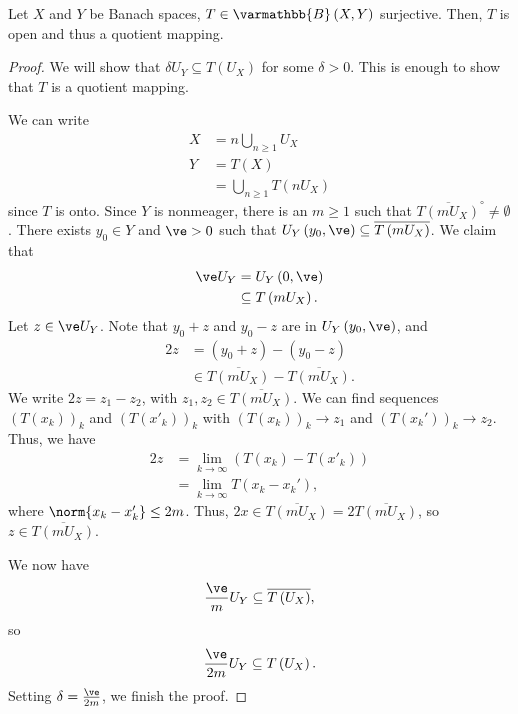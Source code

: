 \documentclass[10pt]{mypackage}
\renewcommand*{\mathbb}[1]{\varmathbb{#1}}
\newcommand{\B}{\mathbb{B}}
\begin{document}
  \begin{theorem}
    Let $X$ and $Y$ be Banach spaces, $T\in \B\left(X,Y\right)$ surjective. Then, $T$ is open and thus a quotient mapping.
  \end{theorem}
  \begin{proof}
    We will show that $\delta U_Y\subseteq T\left(U_X\right)$ for some $\delta > 0$. This is enough to show that $T$ is a quotient mapping.\newline

    We can write
    \begin{align*}
      X &= n\bigcup_{n\geq 1}U_X\\
      Y &= T\left(X\right)\\
        &= \bigcup_{n\geq 1}T\left(nU_X\right)
    \end{align*}
    since $T$ is onto. Since $Y$ is nonmeager, there is an $m \geq 1$ such that $\overline{T\left(mU_X\right)}^{\circ} \neq \emptyset$. There exists $y_0\in Y$ and $\ve > 0$ such that $U_Y\left(y_0,\ve\right) \subseteq \overline{T\left(mU_X\right)}$. We claim that
    \begin{align*}
      \ve U_Y &= U_Y\left(0,\ve\right)\\
              &\subseteq T\left(mU_X\right).
    \end{align*}
    Let $z\in \ve U_Y$. Note that $y_0 + z$ and $y_0 - z$ are in $U_Y\left(y_0,\ve\right)$, and
    \begin{align*}
      2z &= \left(y_0 + z\right) - \left(y_0 - z\right)\\
         &\in \overline{T\left(mU_X\right)} - \overline{T\left(mU_X\right)}.
    \end{align*}
    We write $2z = z_1 - z_2$, with $z_1,z_2\in \overline{T\left(mU_X\right)}$. We can find sequences $\left(T\left(x_k\right)\right)_k$ and $\left(T\left(x'_k\right)\right)_k$ with $\left(T\left(x_k\right)\right)_k\rightarrow z_1$ and $\left(T\left(x_k'\right)\right)_k\rightarrow z_2$. Thus, we have
    \begin{align*}
      2z &= \lim_{k\rightarrow\infty}\left(T\left(x_k\right) - T\left(x'_k\right)\right)\\
         &= \lim_{k\rightarrow\infty}T\left(x_k -x_k'\right),
    \end{align*}
    where $\norm{x_k - x_k'} \leq 2m$. Thus, $2x\in \overline{T\left(mU_X\right)} = 2\overline{T\left(mU_X\right)}$, so $z\in \overline{T\left(mU_X\right)}$.\newline

    We now have
    \begin{align*}
      \frac{\ve}{m}U_Y\subseteq \overline{T\left(U_X\right)},
    \end{align*}
    so
    \begin{align*}
      \frac{\ve}{2m}U_Y\subseteq T\left(U_X\right).
    \end{align*}
    Setting $\delta = \frac{\ve}{2m}$, we finish the proof.
  \end{proof}
\end{document}
